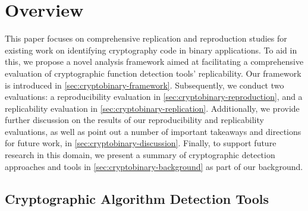 \section{Overview}
\label{sec:cryptobinary-overview}

This paper focuses on comprehensive replication and reproduction studies for existing work on identifying cryptography code in binary applications.
To aid in this, we propose a novel analysis framework aimed at facilitating a comprehensive evaluation of cryptographic function detection tools' replicability. Our framework is introduced in \autoref{sec:cryptobinary-framework}. Subsequently, we conduct two evaluations: a reproducibility evaluation in \autoref{sec:cryptobinary-reproduction}, and a replicability evaluation in \autoref{sec:cryptobinary-replication}. Additionally, we provide further discussion on the results of our reproducibility and replicability evaluations, as well as point out a number of important takeaways and directions for future work, in \autoref{sec:cryptobinary-discussion}. Finally, to support future research in this domain, we present a summary of cryptographic detection approaches and tools in \autoref{sec:cryptobinary-background} as part of our background.


\subsection{Cryptographic Algorithm Detection Tools}
\label{subsec:detection_tools}


